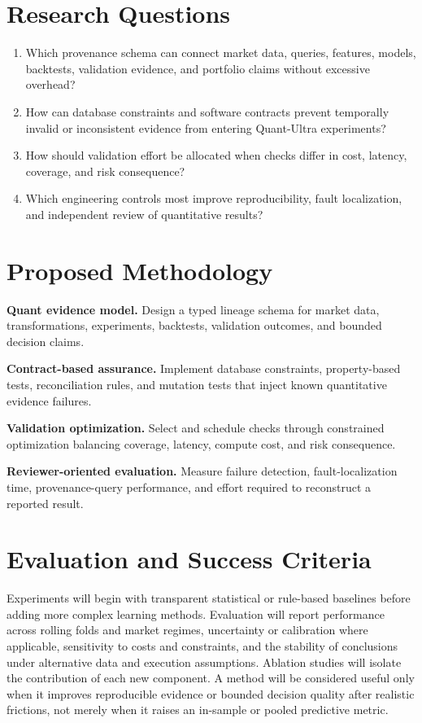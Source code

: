 \documentclass[11pt]{article}
\begin{document}
\section*{Research Questions}
\begin{enumerate}
\item Which provenance schema can connect market data, queries, features, models, backtests, validation evidence, and portfolio claims without excessive overhead?
\item How can database constraints and software contracts prevent temporally invalid or inconsistent evidence from entering Quant-Ultra experiments?
\item How should validation effort be allocated when checks differ in cost, latency, coverage, and risk consequence?
\item Which engineering controls most improve reproducibility, fault localization, and independent review of quantitative results?
\end{enumerate}

\section*{Proposed Methodology}
\textbf{Quant evidence model.} Design a typed lineage schema for market data, transformations, experiments, backtests, validation outcomes, and bounded decision claims.

\textbf{Contract-based assurance.} Implement database constraints, property-based tests, reconciliation rules, and mutation tests that inject known quantitative evidence failures.

\textbf{Validation optimization.} Select and schedule checks through constrained optimization balancing coverage, latency, compute cost, and risk consequence.

\textbf{Reviewer-oriented evaluation.} Measure failure detection, fault-localization time, provenance-query performance, and effort required to reconstruct a reported result.

\section*{Evaluation and Success Criteria}
Experiments will begin with transparent statistical or rule-based baselines before adding more complex learning methods. Evaluation will report performance across rolling folds and market regimes, uncertainty or calibration where applicable, sensitivity to costs and constraints, and the stability of conclusions under alternative data and execution assumptions. Ablation studies will isolate the contribution of each new component. A method will be considered useful only when it improves reproducible evidence or bounded decision quality after realistic frictions, not merely when it raises an in-sample or pooled predictive metric.
\end{document}
